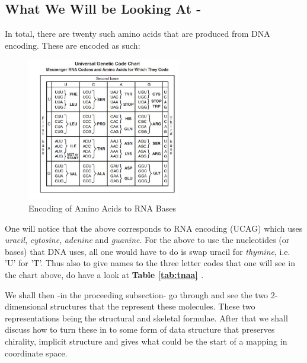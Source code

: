 \documentclass[a4paper,10pt]{article}
\begin{document}
\subsection{What We Will be Looking At -}
In total, there are twenty such amino acids that are produced from DNA encoding. These are encoded as such:
\begin{figure}[H]
\centering
\includegraphics[width=0.6\textwidth]{images/rna_ecode.png}
\caption{Encoding of Amino Acids to RNA Bases}
\label{fig:rna_chart}
\end{figure}
One will notice that the above corresponds to RNA encoding (UCAG) which uses \textit{uracil}, \textit{cytosine}, \textit{adenine} and \textit{guanine}. For the above to use the nucleotides (or bases) that DNA uses, all one would have to do is swap uracil for \textit{thymine}, i.e. 'U' for 'T'. Thus also to give names to the three letter codes that one will see in the chart above, do have a look at \textbf{Table \ref{tab:tnaa} \cite{chart}}. 

We shall then -in the proceeding subsection- go through and see the two 2-dimensional structures that the represent these molecules. These two representations being the structural and skeletal formulae. After that we shall discuss how to turn these in to some form of data structure that preserves chirality, implicit structure and gives what could be the start of a mapping in coordinate space.
\end{document}
